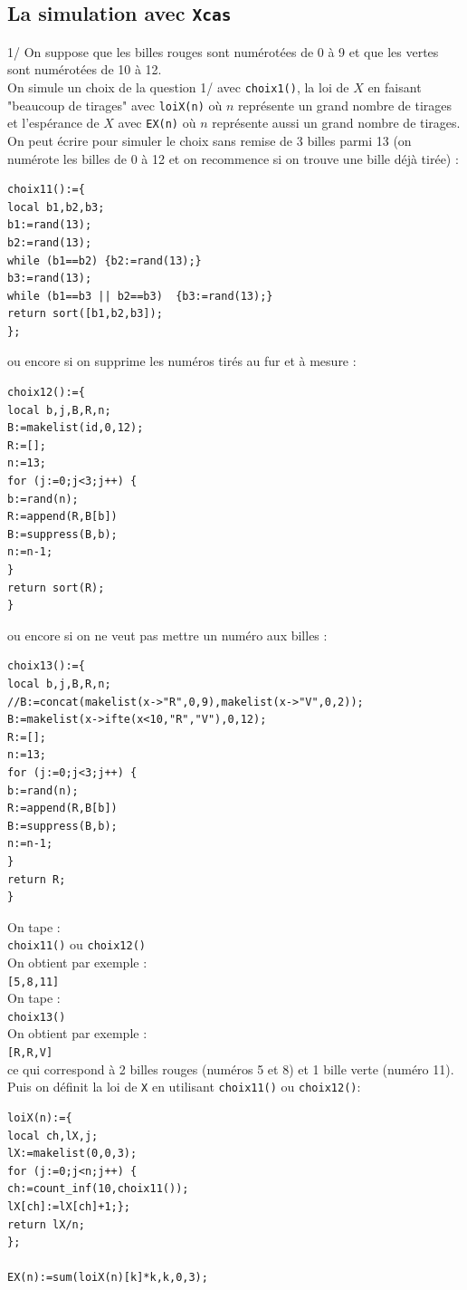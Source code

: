 \documentclass[a4paper,11pt]{book}
\begin{document}
\subsection{La simulation avec {\tt Xcas}}
1/ On suppose que les billes rouges sont num\'erot\'ees de 0 \`a 9 et que les 
vertes sont num\'erot\'ees de 10 \`a 12.\\
On simule un choix de la question 1/ avec {\tt choix1()}, la loi de $X$ en 
faisant "beaucoup de tirages" avec {\tt loiX(n)}
o\`u $n$ repr\'esente un grand nombre de tirages et l'esp\'erance de
$X$ avec {\tt EX(n)} o\`u $n$ repr\'esente  aussi un grand nombre de tirages.
On peut \'ecrire pour simuler le choix sans remise de 3 billes parmi 13 
(on num\'erote les billes de 0 \`a 12 et on recommence si on trouve une bille 
d\'ej\`a tir\'ee) :
\begin{verbatim}
choix11():={
local b1,b2,b3;
b1:=rand(13);
b2:=rand(13);
while (b1==b2) {b2:=rand(13);}
b3:=rand(13);
while (b1==b3 || b2==b3)  {b3:=rand(13);}
return sort([b1,b2,b3]);
};
\end{verbatim}
ou encore si on supprime les num\'eros tir\'es au fur et \`a mesure :
\begin{verbatim}
choix12():={
local b,j,B,R,n;
B:=makelist(id,0,12);
R:=[];
n:=13;
for (j:=0;j<3;j++) {
b:=rand(n);
R:=append(R,B[b])
B:=suppress(B,b);
n:=n-1;
}
return sort(R);
}
\end{verbatim}
ou encore si on ne veut pas mettre un num\'ero aux billes :
\begin{verbatim}
choix13():={
local b,j,B,R,n;
//B:=concat(makelist(x->"R",0,9),makelist(x->"V",0,2));
B:=makelist(x->ifte(x<10,"R","V"),0,12);
R:=[];
n:=13;
for (j:=0;j<3;j++) {
b:=rand(n);
R:=append(R,B[b])
B:=suppress(B,b);
n:=n-1;
}
return R;
}
\end{verbatim}
On tape :\\
{\tt choix11()} ou {\tt choix12()}\\
On obtient par exemple :\\
{\tt [5,8,11]}\\
On tape :\\
{\tt choix13()}\\
On obtient par exemple :\\
{\tt [R,R,V]}\\
ce qui correspond \`a 2 billes rouges (num\'eros 5 et 8) et 1 bille verte
(num\'ero 11).\\
Puis on d\'efinit la loi de {\tt X} en utilisant {\tt choix11()} ou 
{\tt choix12()}:
\begin{verbatim}
loiX(n):={
local ch,lX,j;
lX:=makelist(0,0,3);
for (j:=0;j<n;j++) {
ch:=count_inf(10,choix11());
lX[ch]:=lX[ch]+1;};
return lX/n;
};

EX(n):=sum(loiX(n)[k]*k,k,0,3);
\end{verbatim}
\end{document}
